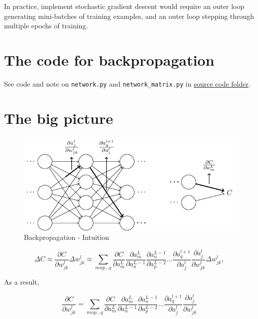 \documentclass[]{book}
\begin{document}
In practice, implement stochastic gradient descent would require an
outer loop generating mini-batches of training examples, and an outer
loop stepping through multiple epochs of training.

\section{The code for
backpropagation}\label{the-code-for-backpropagation}

See code and note on \texttt{network.py} and \texttt{network\_matrix.py}
in \href{./src}{source code folder}.

\section{The big picture}\label{the-big-picture}

\begin{figure}

{\centering \includegraphics[width=1\linewidth]{fig/02_tikz27} 

}

\caption{Backpropagation - Intuition}\label{fig:bkpg-init}
\end{figure}

\begin{equation} 
\Delta C \approx \frac{\partial C}{\partial w^l_{jk}} \Delta w^l_{jk}
         \approx \sum_{mnp\ldots q} 
                 \frac{\partial C}{\partial a^L_m} 
                 \frac{\partial a^L_m}{\partial a^{L-1}_n}
                 \frac{\partial a^{L-1}_n}{\partial a^{L-2}_p} \ldots
                 \frac{\partial a^{l+1}_q}{\partial a^l_j} 
                 \frac{\partial a^l_j}{\partial w^l_{jk}} \Delta w^l_{jk},
\end{equation}

As a result,

\begin{equation} 
\frac{\partial C}{\partial w^l_{jk}} = \sum_{mnp\ldots q} 
  \frac{\partial C}{\partial a^L_m} 
  \frac{\partial a^L_m}{\partial a^{L-1}_n}
  \frac{\partial a^{L-1}_n}{\partial a^{L-2}_p} \ldots
  \frac{\partial a^{l+1}_q}{\partial a^l_j} 
  \frac{\partial a^l_j}{\partial w^l_{jk}}
\end{equation}
\end{document}
